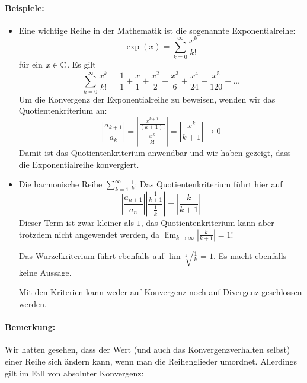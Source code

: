 \paragraph{Beispiele:}
\begin{itemize}
	\item Eine wichtige Reihe in der Mathematik ist die sogenannte Exponentialreihe:
	\begin{equation*}
		\exp(x)=\sum\limits_{k=0}^\infty \frac{x^k}{k!}
	\end{equation*}
	für ein $x\in\mathbb{C}$. Es gilt
	\begin{equation*}
		\sum\limits_{k=0}^\infty \frac{x^k}{k!} = \frac{1}{1}+\frac{x}{1}+\frac{x^2}{2}+\frac{x^3}{6}+\frac{x^4}{24}+\frac{x^5}{120}+\ldots
	\end{equation*}
	Um die Konvergenz der Exponentialreihe zu beweisen, wenden wir das Quotientenkriterium an:
	\begin{equation*}
		\left|\frac{a_{k+1}}{a_k}\right|=\left|\frac{\frac{x^{k+1}}{(k+1)!}}{\frac{x^k}{k!}}\right|=\left|\frac{x^k}{k+1}\right|\longrightarrow 0
	\end{equation*}
	Damit ist das Quotientenkriterium anwendbar und wir haben gezeigt, dass die Exponentialreihe konvergiert.

	\item Die harmonische Reihe $\sum_{k=1}^\infty \frac 1k$:
	Das Quotientenkriterium führt hier auf
	\begin{equation*}
		\left|\frac{a_{n+1}}{a_n}\right|\left|\frac{\frac{1}{k+1}}{\frac 1k}\right| = \left|\frac{k}{k+1}\right|
	\end{equation*}
	Dieser Term ist zwar kleiner als $1$, das Quotientenkriterium kann aber trotzdem nicht angewendet werden, da $\lim_{k\to\infty}\left|\frac{k}{k+1}\right|=1$!

	Das Wurzelkriterium führt ebenfalls auf $\lim\sqrt[k]{\frac 1k}=1$. Es macht ebenfalls keine Aussage.

	Mit den Kriterien kann weder auf Konvergenz noch auf Divergenz geschlossen werden.
\end{itemize}

\paragraph{Bemerkung:}
Wir hatten gesehen, dass der Wert (und auch das Konvergenzverhalten selbst) einer Reihe sich ändern kann, wenn man die Reihenglieder umordnet. Allerdings gilt im Fall von absoluter Konvergenz:

